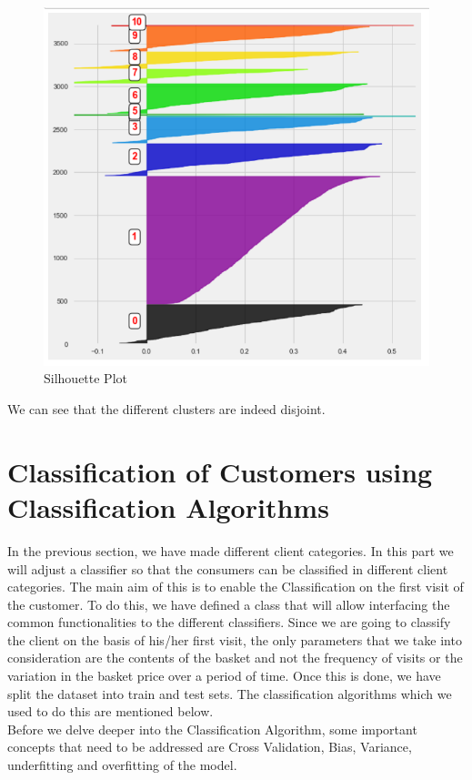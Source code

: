 \begin{figure}
\caption{Silhouette Plot}
\label{4.5}
\centering
\includegraphics[width=\columnwidth]{images/4_5.PNG}
\end{figure}

We can see that the different clusters are indeed disjoint.

\section{Classification of Customers using Classification Algorithms}

In the previous section, we have made different client categories. In this part we will adjust a classifier so that the consumers can be classified in different client categories. The main aim of this is to enable the Classification on the first visit of the customer. To do this, we have defined a class that will allow interfacing the common functionalities to the different classifiers. Since we are going to classify the client on the basis of his/her first visit, the only parameters that we take into consideration are the contents of the basket and not the frequency of visits or the variation in the basket price over a period of time. Once this is done, we have split the dataset into train and test sets. The classification algorithms which we used to do this are mentioned below.\\
Before we delve deeper into the Classification Algorithm, some important concepts that need to be addressed are Cross Validation, Bias, Variance, underfitting and overfitting of the model.


